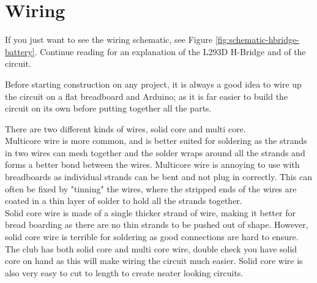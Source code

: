 \documentclass[../TinyBot.tex]{subfiles}
\begin{document}
\section{Wiring} \label{wiring}
If you just want to see the wiring schematic, see Figure \ref{fig:schematic-hbridge-battery}. Continue reading for an explanation of the L293D H-Bridge and of the circuit. 

\bigskip

Before starting construction on any project, it is always a good idea to wire up the circuit on a flat breadboard and Arduino; as it is far easier to build the circuit on its own before putting together all the parts. \\

\begin{warningbox}
    There are two different kinds of wires, solid core and multi core. \\

    
    Multicore wire is more common, and is better suited for soldering as the strands in two wires can mesh together and the solder  wraps around all the strands and forms a better bond between the wires. Multicore wire is annoying to use with breadboards as individual strands can be bent and not plug in correctly. This can often be fixed by "tinning" the wires, where the stripped ends of the wires are coated in a thin layer of solder to hold all the strands together.\\

    Solid core wire is made of a single thicker strand of wire, making it better for bread boarding as there are no thin strands to be pushed out of shape. However, solid core wire is terrible for soldering as good connections are hard to ensure. \\



    The club has both solid core and multi core wire, double check you have solid core on hand as this will make wiring the circuit much easier. Solid core wire is also very easy to cut to length to create neater looking circuits. \\
    
\end{warningbox}
\end{document}
